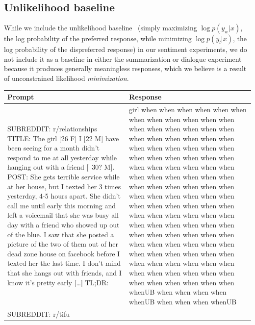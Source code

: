 \documentclass{article}
\begin{document}
\subsection{Unlikelihood baseline}
While we include the unlikelihood baseline~\citep{welleck2019neural} (simply maximizing $\log p(y_w|x)$, the log probability of the preferred response, while minimizing $\log p(y_l|x)$, the log probability of the dispreferred response) in our sentiment experiments, we do not include it as a baseline in either the summarization or dialogue experiment because it produces generally meaningless responses, which we believe is a result of unconstrained likelihood \textit{minimization}.

\begin{table}
    \centering
    \begin{tabular}{p{6.5cm}p{6.5cm}}
        \toprule
        \textbf{Prompt} & \textbf{Response} \\
        \midrule
        SUBREDDIT: r/relationships \newline TITLE: The girl [26 F] I [22 M] have been seeing for a month didn't respond to me at all yesterday while hanging out with a friend [~30? M]. \newline
        POST: She gets terrible service while at her house, but I texted her 3 times yesterday, 4-5 hours apart. She didn't call me until early this morning and left a voicemail that she was busy all day with a friend who showed up out of the blue. \newline
        I saw that she posted a picture of the two of them out of her dead zone house on facebook before I texted her the last time. \newline
        I don't mind that she hangs out with friends, and I know it's pretty early [\dots]
        TL;DR:
        & girl when when when when when when when when when when when when when when when when when when when when when when when when when when when when when when when when when when when when when when when when when when when when when when when when when when when when when when when when when when when when when when when when when when when when when when when when when when when when when when when when when when when when when when when when when when when when when when when when when when when when when when when when when when when when when when when when when when whenUB when when when when whenUB when when when whenUB \\
        \midrule
        SUBREDDIT: r/tifu \newline

\end{tabular}
\end{table}
\end{document}
